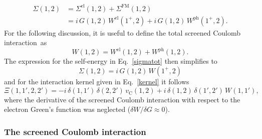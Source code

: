 %
\begin{equation}\label{sigmatot}
    \begin{aligned}
        \Sigma(1,2) &  = \Sigma^\text{el}(1,2) + \Sigma^\text{FM}(1,2) \\[10pt]
                    & = i\,G(1,2)\,W^\text{el}(1^+,2)+i\,G(1,2)\,W^\text{ph}(1^+,2).
    \end{aligned}
\end{equation}
%
For the following discussion, it is useful to define the total screened Coulomb interaction~as 
%
\begin{equation}\label{total_w}
    W(1,2) =W^\text{el}(1,2) + W^\text{ph}(1,2).
\end{equation}
%
The expression for the self-energy in Eq.~\eqref{sigmatot} then simplifies to 
%
\begin{equation}
     \Sigma(1,2) = i\,G(1,2)\,W(1^+,2)
\end{equation}
%
 and for the interaction kernel given in Eq.~\eqref{kernel} it follows 
\begin{equation}\label{bse_kernel}
    \Xi(1,1',2,2') = -i\,\delta(1,1')\,\delta(2,2')\,v_\text{C}^{\phantom{I}}(1,2)  +i\,\delta(1,2)\,\delta(1',2')\,W(1,1'),
\end{equation}
where the derivative of the screened Coulomb interaction with respect to the electron Green's function was  neglected ($\delta W/\delta G\approx0$).
%
\subsubsection{The screened Coulomb interaction}\label{subsec_scrcoulint}

